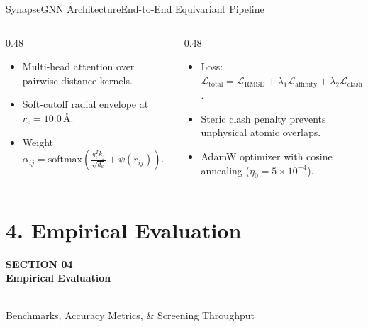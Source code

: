 \documentclass[10pt,aspectratio=169]{beamer}
\begin{document}
\begin{frame}{SynapseGNN Architecture}{End-to-End Equivariant Pipeline}
  \vspace{-4pt}
  \begin{columns}[T]
    \begin{column}{0.48\textwidth}
      \begin{tcolorbox}[defensebox,title={\faMicrochip \quad Spatial Attention Module}]
        \tiny
        \begin{itemize}
          \item Multi-head attention over pairwise distance kernels.
          \item Soft-cutoff radial envelope at $r_c = 10.0\,\text{\AA}$.
          \item Weight $\alpha_{ij} = \mathrm{softmax}\left( \frac{q_i^T k_j}{\sqrt{d_k}} + \psi(r_{ij}) \right)$.
        \end{itemize}
      \end{tcolorbox}
    \end{column}
    
    \begin{column}{0.48\textwidth}
      \begin{tcolorbox}[highlightbox,title={\faCogs \quad Optimization \& Loss Function}]
        \tiny
        \begin{itemize}
          \item Loss: $\mathcal{L}_{\text{total}} = \mathcal{L}_{\text{RMSD}} + \lambda_1 \mathcal{L}_{\text{affinity}} + \lambda_2 \mathcal{L}_{\text{clash}}$.
          \item Steric clash penalty prevents unphysical atomic overlaps.
          \item AdamW optimizer with cosine annealing ($\eta_0 = 5 \times 10^{-4}$).
        \end{itemize}
      \end{tcolorbox}
    \end{column}
  \end{columns}
\end{frame}

\section{4. Empirical Evaluation}
{
\begin{frame}[plain]
  \vfill
  \begin{center}
    {\tiny\color{AmberAccent}\bfseries SECTION 04} \\[4pt]
    {\Huge\bfseries\color{White} Empirical Evaluation} \\[8pt]
     \\[8pt]
    {\small\color{CardBorder} Benchmarks, Accuracy Metrics, \& Screening Throughput}
  \end{center}
  \vfill
\end{frame}
}
\end{document}
